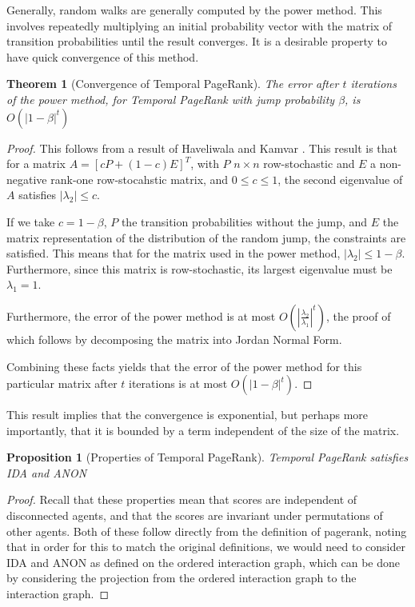 \documentclass[a4paper,11pt]{book}
\newtheorem{theorem}{Theorem}
\newtheorem{proposition}{Proposition}
\theoremstyle{definition}
\begin{document}
Generally, random walks are generally computed by the power method. This involves repeatedly
multiplying an initial probability vector with the matrix of transition probabilities until
the result converges. It is a desirable property to have quick convergence of this method.

\begin{theorem}[Convergence of Temporal PageRank]
    The error after $t$ iterations of the power method, for Temporal PageRank with
    jump probability $\beta$, is $O(|1-\beta|^t)$
    \label{}
\end{theorem}

\begin{proof}
    This follows from a result of Haveliwala and Kamvar \cite{haveliwala2003second}. This
    result is that for a matrix $A = [cP + (1-c)E]^T$, with $P$ $n \times n$ row-stochastic
    and $E$ a non-negative rank-one row-stocahstic matrix, and $0 \leq c \leq 1$, the
    second eigenvalue of $A$ satisfies $|\lambda_2| \leq c$. 

    If we take $c=1-\beta$, $P$ the transition probabilities without the jump, and $E$ the
    matrix representation of the distribution of the random jump, the constraints are satisfied.
    This means that for the matrix used in the power method, $|\lambda_2| \leq 1-\beta$.
    Furthermore, since this matrix is row-stochastic, its largest eigenvalue must be $\lambda_1=1$.

    Furthermore, the error of the power method is at most $O\left(\left|\frac{\lambda_2}{\lambda_1}\right|^t\right)$,
    the proof of which follows by decomposing the matrix into Jordan Normal Form.

    Combining these facts yields that the error of the power method for this particular matrix
    after $t$ iterations is at most $O(|1-\beta|^t)$. 
\end{proof}

This result implies that the convergence is exponential, but perhaps more importantly, that it is bounded
by a term independent of the size of the matrix. 

\begin{proposition}[Properties of Temporal PageRank]
    Temporal PageRank satisfies IDA and ANON  
    \label{prop:prop_temp_pr}
\end{proposition}

\begin{proof}
    Recall that these properties mean that scores are independent of disconnected agents, and that
    the scores are invariant under permutations of other agents. Both of these follow directly
    from the definition of pagerank, noting that in order for this to match the original definitions,
    we would need to consider IDA and ANON as defined on the ordered interaction graph, which can
    be done by considering the projection from the ordered interaction graph to the interaction graph.
\end{proof}
\end{document}

